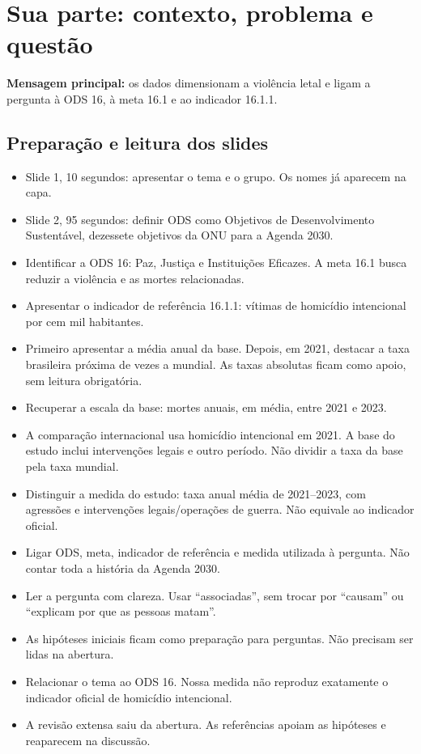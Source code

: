 \section{Sua parte: contexto, problema e questão}
\textbf{Mensagem principal:} os dados dimensionam a violência letal e ligam a pergunta à ODS 16, à meta 16.1 e ao indicador 16.1.1.
\subsection{Preparação e leitura dos slides}
\begin{itemize}
\item Slide 1, 10 segundos: apresentar o tema e o grupo. Os nomes já aparecem na capa.
\item Slide 2, 95 segundos: definir ODS como Objetivos de Desenvolvimento Sustentável, dezessete objetivos da ONU para a Agenda 2030.
\item Identificar a ODS 16: Paz, Justiça e Instituições Eficazes. A meta 16.1 busca reduzir a violência e as mortes relacionadas.
\item Apresentar o indicador de referência 16.1.1: vítimas de homicídio intencional por cem mil habitantes.
\item Primeiro apresentar a média anual da base. Depois, em 2021, destacar a taxa brasileira próxima de \nRazaoContexto{} vezes a mundial. As taxas absolutas ficam como apoio, sem leitura obrigatória.
\item Recuperar a escala da base: \nHomAno{} mortes anuais, em média, entre 2021 e 2023.
\item A comparação internacional usa homicídio intencional em 2021. A base do estudo inclui intervenções legais e outro período. Não dividir a taxa da base pela taxa mundial.
\item Distinguir a medida do estudo: taxa anual média de 2021--2023, com agressões e intervenções legais/operações de guerra. Não equivale ao indicador oficial.
\item Ligar ODS, meta, indicador de referência e medida utilizada à pergunta. Não contar toda a história da Agenda 2030.
\item Ler a pergunta com clareza. Usar ``associadas'', sem trocar por ``causam'' ou ``explicam por que as pessoas matam''.
\item As hipóteses iniciais ficam como preparação para perguntas. Não precisam ser lidas na abertura.
\item Relacionar o tema ao ODS 16. Nossa medida não reproduz exatamente o indicador oficial de homicídio intencional.
\item A revisão extensa saiu da abertura. As referências apoiam as hipóteses e reaparecem na discussão.
\end{itemize}
